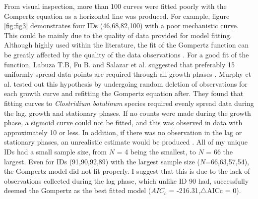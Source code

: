 \documentclass[11pt]{article}
\begin{document}
From visual inspection, more than 100 curves were fitted poorly with the Gompertz equation as a horizontal line was produced. For example, figure \ref{fig:fig3} demonstrates 
four IDs (46,68,82,100) with a poor mechanistic curve. This could be mainly due to the quality of data provided for model fitting. Although highly used within the literature, the fit of the Gompertz function can be
greatly affected by the quality of the data observations \cite{labuza_growth_1993}. For a good fit of the function, Labuza T.B, Fu B. and Salazar et al. suggested that preferably 15 uniformly spread
data points are required through all growth phases \cite{labuza_growth_1993,salazar_primary_2021}. Murphy et al. tested out this hypothesis by undergoing random deletion of observations
for each growth curve and refitting the Gompertz equation after. They found that fitting curves to \emph{Clostridium botulinum} species required evenly spread data
during the lag, growth and stationary phases. If no counts were made during the growth phase, a sigmoid curve could not be fitted, and this was
observed in data with approximately 10 or less. In addition, if there was no observation in the lag or stationary phases, an unrealistic 
estimate would be produced \cite{murphy_development_1996}. All of my unique IDs had a small sample size, from $N$ = 4 being the smallest, to $N$ = 66 the largest. Even for IDs
(91,90,92,89) with the largest sample size ($N$=66,63,57,54), the Gompertz model did not fit properly. I suggest that this is due to the lack
of observations collected during the lag phase, which unlike ID 90 had, successfully deemed the Gompertz as the best fitted model ($AIC_{c}$ = -216.31,$\triangle$AICc = 0). 
\end{document}
